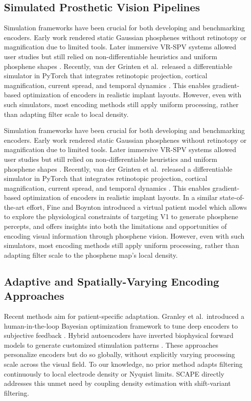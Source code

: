 \subsection{Simulated Prosthetic Vision Pipelines}
Simulation frameworks have been crucial for both developing and benchmarking encoders. Early work rendered static Gaussian phosphenes without retinotopy or magnification due to limited tools. Later immersive VR-SPV systems allowed user studies but still relied on non-differentiable heuristics and uniform phosphene shapes \cite{Kasowski2022}. Recently, van der Grinten et al.\ released a differentiable simulator in PyTorch that integrates retinotopic projection, cortical magnification, current spread, and temporal dynamics \cite{vanderGrinten2024}. This enables gradient-based optimization of encoders in realistic implant layouts. However, even with such simulators, most encoding methods still apply uniform processing, rather than adapting filter scale to local density.

 Simulation frameworks have been crucial for both developing and benchmarking encoders. Early work rendered static Gaussian phosphenes without retinotopy or magnification due to limited tools. Later immersive VR-SPV systems allowed user studies but still relied on non-differentiable heuristics and uniform phosphene shapes \cite{Kasowski2022}. Recently, van der Grinten et al.\ released a differentiable simulator in PyTorch that integrates retinotopic projection, cortical magnification, current spread, and temporal dynamics \cite{vanderGrinten2024}. This enables gradient-based optimization of encoders in realistic implant layouts. In a similar state-of-the-art effort, Fine and Boynton introduced a virtual patient model \cite{Fine2024} which allows to explore the physiological constraints of targeting V1 to generate phosphene percepts, and offers insights into both the limitations and opportunities of encoding visual information through phosphene vision. However, even with such simulators, most encoding methods still apply uniform processing, rather than adapting filter scale to the phosphene map’s local density.

\subsection{Adaptive and Spatially-Varying Encoding Approaches}
Recent methods aim for patient-specific adaptation. Granley et al.\ introduced a human-in-the-loop Bayesian optimization framework to tune deep encoders to subjective feedback \cite{Granley2023}. Hybrid autoencoders have inverted biophysical forward models to generate customized stimulation patterns \cite{Granley2022,deRuytervanSteveninck2020}. These approaches personalize encoders but do so globally, without explicitly varying processing scale across the visual field. To our knowledge, no prior method adapts filtering continuously to local electrode density or Nyquist limits. SCAPE directly addresses this unmet need by coupling density estimation with shift-variant filtering.
